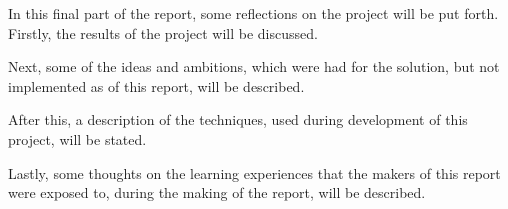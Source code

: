 In this final part of the report, some reflections on the project will be put forth.
Firstly, the results of the project will be discussed.

Next, some of the ideas and ambitions, which were had for the solution, but not implemented as of this report, will be described.

After this, a description of the techniques, used during development of this project, will be stated.

Lastly, some thoughts on the learning experiences that the makers of this report were exposed to, during the making of the report, will be described.
